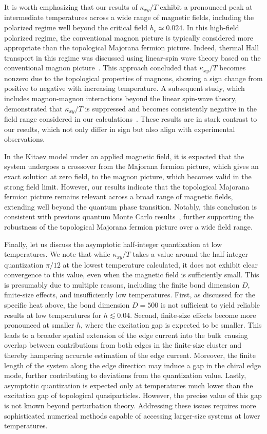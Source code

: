 \documentclass[twocolumn,superscriptaddress,showpacs, longbibliography, aps, prx]{revtex4-2}
\begin{document}
It is worth emphasizing that our results of $\kappa_{xy}/T$ exhibit a pronounced peak at intermediate temperatures across a wide range of magnetic fields, including the polarized regime well beyond the critical field $h_c \simeq 0.024$. 
In this high-field polarized regime, the conventional magnon picture is typically considered more appropriate than the topological Majorana fermion picture. 
Indeed, thermal Hall transport in this regime was discussed using linear-spin wave theory based on the conventional magnon picture~\cite{McClartyDGRPMP2018}. 
This approach concluded that $\kappa_{xy}/T$ becomes nonzero due to the topological properties of magnons, showing a sign change from positive to negative with increasing temperature. 
A subsequent study, which includes magnon-magnon interactions beyond the linear spin-wave theory, demonstrated that $\kappa_{xy}/T$ is suppressed and becomes consistently negative in the field range considered in our calculations~\cite{Koyama2024}. 
These results are in stark contrast to our results, which not only differ in sign but also align with experimental observations. 

In the Kitaev model under an applied magnetic field, it is expected that the system undergoes a crossover from the Majorana fermion picture, which gives an exact solution at zero field, to the magnon picture, which becomes valid in the strong field limit. 
However, our results indicate that the topological Majorana fermion picture remains relevant across a broad range of magnetic fields, extending well beyond the quantum phase transition. 
Notably, this conclusion is consistent with previous quantum Monte Carlo results~\cite{YoshitakeNKM2020}, further supporting the robustness of the topological Majorana fermion picture over a wide field range. 

Finally, let us discuss the asymptotic half-integer quantization at low temperatures. 
We note that while $\kappa_{xy}/T$ takes a value around the half-integer quantization $\pi/12$ at the lowest temperature calculated, it does not exhibit clear convergence to this value, even when the magnetic field is sufficiently small.
This is presumably due to multiple reasons, including the finite bond dimension $D$, finite-size effects, and insufficiently low temperatures.
First, as discussed for the specific heat above, the bond dimension $D=500$ is not sufficient to yield reliable results at low temperatures for $h\lesssim0.04$.
Second, finite-size effects become more pronounced at smaller $h$, where the excitation gap is expected to be smaller. 
This leads to a broader spatial extension of the edge current into the bulk\, causing overlap between contributions from both edges in the finite-size cluster and thereby hampering accurate estimation of the edge current. 
Moreover, the finite length of the system along the edge direction may induce a gap in the chiral edge mode, further contributing to deviations from the quantization value. 
Lastly, asymptotic quantization is expected only at temperatures much lower than the excitation gap of topological quasiparticles. 
However, the precise value of this gap is not known beyond perturbation theory. 
Addressing these issues requires more sophisticated numerical methods capable of accessing larger-size systems at lower temperatures. 
\end{document}

